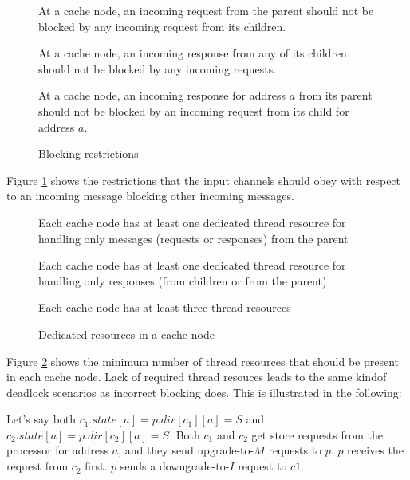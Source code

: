 \begin{figure}\small
\begin{requirement}
At a cache node, an incoming request from the parent should not be blocked by any
incoming request from its children.\label{cReqNoBlockPReq}
\end{requirement}
\begin{requirement}
At a cache node, an incoming response from any of its children should not
be blocked by any incoming requests.\label{reqNoBlockResp}
\end{requirement}
\begin{requirement}
At a cache node, an incoming response for address $a$ from its parent should not be blocked by
an incoming request from its child for address $a$. \label{reqBlockResp2}
\end{requirement}
\caption{Blocking restrictions}
\label{blocking}
\end{figure}

Figure \ref{blocking} shows the restrictions that the input channels should
obey with respect to an incoming message blocking other incoming messages.

\begin{figure}\small
\begin{requirement}
Each cache node has at least one dedicated thread resource for handling only messages
(requests or responses) from the parent\label{dedicate1}
\end{requirement}
\begin{requirement}
Each cache node has at least one dedicated thread resource for handling only responses
(from children or from the parent)\label{dedicate2}
\end{requirement}
\begin{requirement}
Each cache node has at least three thread resources\label{dedicate3}
\end{requirement}
\caption{Dedicated resources in a cache node}
\label{dedicated}
\end{figure}

Figure \ref{dedicated} shows the minimum number of thread resources that should
be present in each cache node. Lack of required thread resouces leads to the same
kindof deadlock scenarios as incorrect blocking does. This is illustrated in the
following:

Let's say both $c_1.state[a] = p.dir[c_1][a] = S$ and $c_2.state[a] =
p.dir[c_2][a] = S$. Both $c_1$ and $c_2$ get store requests from the processor
for address $a$, and they send upgrade-to-$M$ requests to $p$.  $p$ receives the
request from $c_2$ first. $p$ sends a downgrade-to-$I$ request to $c1$.

